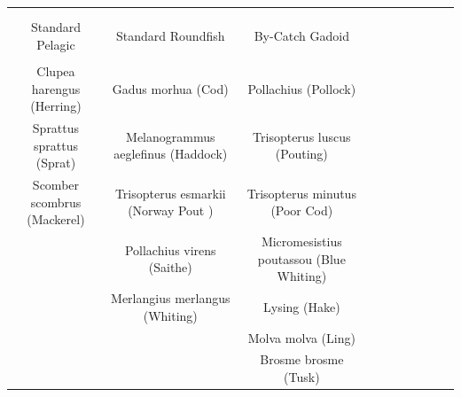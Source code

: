 \documentclass[a4paper 12pt]{article}
\numberwithin{equation}{section}
\begin{document}
\begin{table}[h!]
\centering
\setlength\tabcolsep{1.5pt} 
\begin{tabular}{cccccccccc}
\hline \\[0.1ex]
\multicolumn{2}{c}{} \\[0.1ex]
Standard Pelagic               & Standard Roundfish & By-Catch Gadoid       \\[1.5ex]
\hline \\[0.1ex]
 Clupea harengus (Herring) &  Gadus morhua (Cod)  & Pollachius (Pollock)      \\[1.5ex]
 Sprattus sprattus (Sprat)   & Melanogrammus aeglefinus (Haddock) & Trisopterus luscus (Pouting) \\[1.5ex]
 Scomber scombrus (Mackerel) & Trisopterus esmarkii (Norway Pout ) & Trisopterus minutus (Poor Cod) \\[1.5ex]
 & Pollachius virens (Saithe)  & Micromesistius poutassou (Blue Whiting)   \\[1.5ex]
& Merlangius merlangus (Whiting)  & Lysing (Hake)  \\[1.5ex]
& &  Molva molva (Ling) \\[1.5ex]
& &   Brosme brosme (Tusk) \\[0.5ex]
\hline
\end{tabular}
\end{table}
\end{document}
